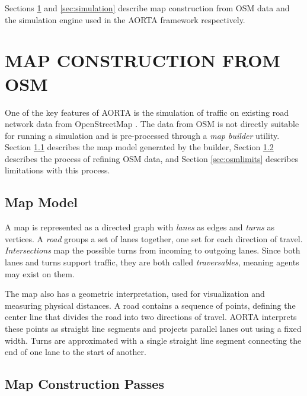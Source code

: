 \documentclass[letterpaper, 10 pt, conference]{ieeeconf}  %
\begin{document}
Sections \ref{sec:map} and \ref{sec:simulation} describe map construction from
OSM data and the simulation engine used in the AORTA framework respectively.


\section{MAP CONSTRUCTION FROM OSM}
\label{sec:map}

One of the key features of AORTA is the simulation of traffic on existing road
network data from OpenStreetMap \cite{osm}. The data from OSM is not directly
suitable for running a simulation and is pre-processed through a \emph{map
builder} utility. Section \ref{sec:mapmodel} describes the map model generated
by the builder, Section \ref{sec:mapconstruction} describes the process of
refining OSM data, and Section \ref{sec:osmlimits} describes limitations with
this process.

\subsection{Map Model}
\label{sec:mapmodel}

A map is represented as a directed graph with \emph{lanes} as edges and
\emph{turns} as vertices. A \emph{road} groups a set of lanes together, one set
for each direction of travel. \emph{Intersections} map the possible turns from
incoming to outgoing lanes. Since both lanes and turns support traffic, they
are both called \emph{traversables}, meaning agents may exist on them.

The map also has a geometric interpretation, used for visualization and
measuring physical distances. A road contains a sequence of points, defining the
center line that divides the road into two directions of travel. AORTA
interprets these points as straight line segments and projects parallel lanes
out using a fixed width. Turns are approximated with a single straight line
segment connecting the end of one lane to the start of another.

\subsection{Map Construction Passes}
\label{sec:mapconstruction}
\end{document}
